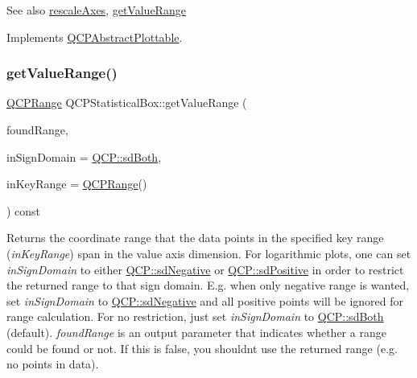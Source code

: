 \begin{DoxySeeAlso}{See also}
\hyperlink{class_q_c_p_abstract_plottable_a1491c4a606bccd2d09e65e11b79eb882}{rescale\+Axes}, \hyperlink{class_q_c_p_statistical_box_ab3388a21d0c2e86fbc0cba9c06ceb49b}{get\+Value\+Range} 
\end{DoxySeeAlso}


Implements \hyperlink{class_q_c_p_abstract_plottable_a4da16d3cd4b509e1104a9b0275623c96}{Q\+C\+P\+Abstract\+Plottable}.

\mbox{\label{class_q_c_p_statistical_box_ab3388a21d0c2e86fbc0cba9c06ceb49b}} 
\subsubsection{\texorpdfstring{get\+Value\+Range()}{getValueRange()}}
{\footnotesize\ttfamily \hyperlink{class_q_c_p_range}{Q\+C\+P\+Range} Q\+C\+P\+Statistical\+Box\+::get\+Value\+Range (\begin{DoxyParamCaption}\item[{bool \&}]{found\+Range,  }\item[{\hyperlink{namespace_q_c_p_afd50e7cf431af385614987d8553ff8a9}{Q\+C\+P\+::\+Sign\+Domain}}]{in\+Sign\+Domain = {\ttfamily \hyperlink{namespace_q_c_p_afd50e7cf431af385614987d8553ff8a9aa38352ef02d51ddfa4399d9551566e24}{Q\+C\+P\+::sd\+Both}},  }\item[{const \hyperlink{class_q_c_p_range}{Q\+C\+P\+Range} \&}]{in\+Key\+Range = {\ttfamily \hyperlink{class_q_c_p_range}{Q\+C\+P\+Range}()} }\end{DoxyParamCaption}) const\hspace{0.3cm}{\ttfamily [virtual]}}

Returns the coordinate range that the data points in the specified key range ({\itshape in\+Key\+Range}) span in the value axis dimension. For logarithmic plots, one can set {\itshape in\+Sign\+Domain} to either \hyperlink{namespace_q_c_p_afd50e7cf431af385614987d8553ff8a9a2d18af0bc58f6528d1e82ce699fe4829}{Q\+C\+P\+::sd\+Negative} or \hyperlink{namespace_q_c_p_afd50e7cf431af385614987d8553ff8a9a584784b75fb816abcc627cf743bb699f}{Q\+C\+P\+::sd\+Positive} in order to restrict the returned range to that sign domain. E.\+g. when only negative range is wanted, set {\itshape in\+Sign\+Domain} to \hyperlink{namespace_q_c_p_afd50e7cf431af385614987d8553ff8a9a2d18af0bc58f6528d1e82ce699fe4829}{Q\+C\+P\+::sd\+Negative} and all positive points will be ignored for range calculation. For no restriction, just set {\itshape in\+Sign\+Domain} to \hyperlink{namespace_q_c_p_afd50e7cf431af385614987d8553ff8a9aa38352ef02d51ddfa4399d9551566e24}{Q\+C\+P\+::sd\+Both} (default). {\itshape found\+Range} is an output parameter that indicates whether a range could be found or not. If this is false, you shouldn\textquotesingle{}t use the returned range (e.\+g. no points in data).

